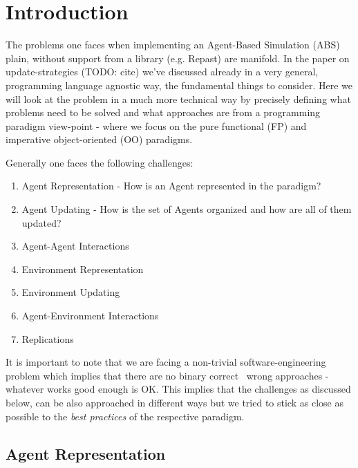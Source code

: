 \chapter{Introduction}

The problems one faces when implementing an Agent-Based Simulation (ABS) plain, without support from a library (e.g. Repast) are manifold. In the paper on update-strategies (TODO: cite) we've discussed already in a very general, programming language agnostic way, the fundamental things to consider. Here we will look at the problem in a much more technical way by precisely defining what problems need to be solved and what approaches are from a programming paradigm view-point - where we focus on the pure functional (FP) and imperative object-oriented (OO) paradigms.

Generally one faces the following challenges:

\begin{enumerate}
	\item Agent Representation - How is an Agent represented in the paradigm?
	\item Agent Updating - How is the set of Agents organized and how are all of them updated?
	\item Agent-Agent Interactions 
	\item Environment Representation
	\item Environment Updating
	\item Agent-Environment Interactions
	\item Replications
\end{enumerate}

It is important to note that we are facing a non-trivial software-engineering problem which implies that there are no binary correct \ wrong approaches - whatever works good enough is OK. This implies that the challenges as discussed below, can be also approached in different ways but we tried to stick as close as possible to the \textit{best practices} of the respective paradigm.

\section{Agent Representation}
